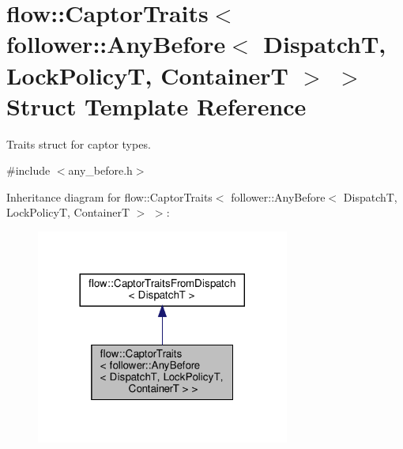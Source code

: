 \hypertarget{structflow_1_1_captor_traits_3_01follower_1_1_any_before_3_01_dispatch_t_00_01_lock_policy_t_00_01_container_t_01_4_01_4}{}\section{flow\+:\+:Captor\+Traits$<$ follower\+:\+:Any\+Before$<$ DispatchT, Lock\+PolicyT, ContainerT $>$ $>$ Struct Template Reference}
\label{structflow_1_1_captor_traits_3_01follower_1_1_any_before_3_01_dispatch_t_00_01_lock_policy_t_00_01_container_t_01_4_01_4}


Traits struct for captor types.  




{\ttfamily \#include $<$any\+\_\+before.\+h$>$}



Inheritance diagram for flow\+:\+:Captor\+Traits$<$ follower\+:\+:Any\+Before$<$ DispatchT, Lock\+PolicyT, ContainerT $>$ $>$\+:
\nopagebreak
\begin{figure}[H]
\begin{center}
\leavevmode
\includegraphics[width=236pt]{structflow_1_1_captor_traits_3_01follower_1_1_any_before_3_01_dispatch_t_00_01_lock_policy_t_00_ae3a1d83bc298c4eeaed76582652fe69}
\end{center}
\end{figure}


